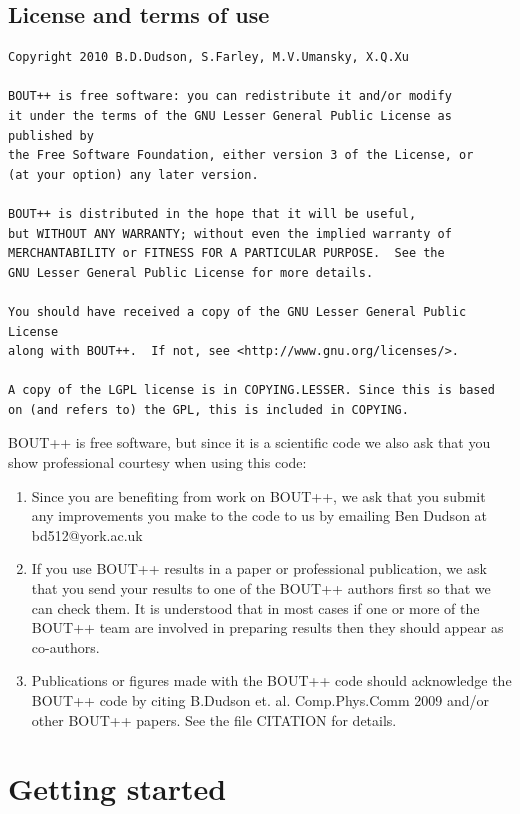 \documentclass[12pt]{article}
\begin{document}
\subsection{License and terms of use}

\begin{verbatim}
Copyright 2010 B.D.Dudson, S.Farley, M.V.Umansky, X.Q.Xu

BOUT++ is free software: you can redistribute it and/or modify
it under the terms of the GNU Lesser General Public License as published by
the Free Software Foundation, either version 3 of the License, or
(at your option) any later version.

BOUT++ is distributed in the hope that it will be useful,
but WITHOUT ANY WARRANTY; without even the implied warranty of
MERCHANTABILITY or FITNESS FOR A PARTICULAR PURPOSE.  See the
GNU Lesser General Public License for more details.

You should have received a copy of the GNU Lesser General Public License
along with BOUT++.  If not, see <http://www.gnu.org/licenses/>.

A copy of the LGPL license is in COPYING.LESSER. Since this is based
on (and refers to) the GPL, this is included in COPYING.
\end{verbatim}

BOUT++ is free software, but since it is a
scientific code we also ask that you show professional courtesy
when using this code:

\begin{enumerate}
\item Since you are benefiting from work on BOUT++, we ask that you
  submit any improvements you make to the code to us by emailing 
  Ben Dudson at bd512@york.ac.uk
\item If you use BOUT++ results in a paper or professional publication,
  we ask that you send your results to one of the BOUT++ authors
  first so that we can check them. It is understood that in most cases
  if one or more of the BOUT++ team are involved in preparing results
  then they should appear as co-authors.
\item Publications or figures made with the BOUT++ code should acknowledge the
  BOUT++ code by citing B.Dudson et. al. Comp.Phys.Comm 2009 \cite{Dudson2009}
  and/or other BOUT++ papers. See the file CITATION for details.
\end{enumerate}

\section{Getting started}
\label{sec:install}
\end{document}
